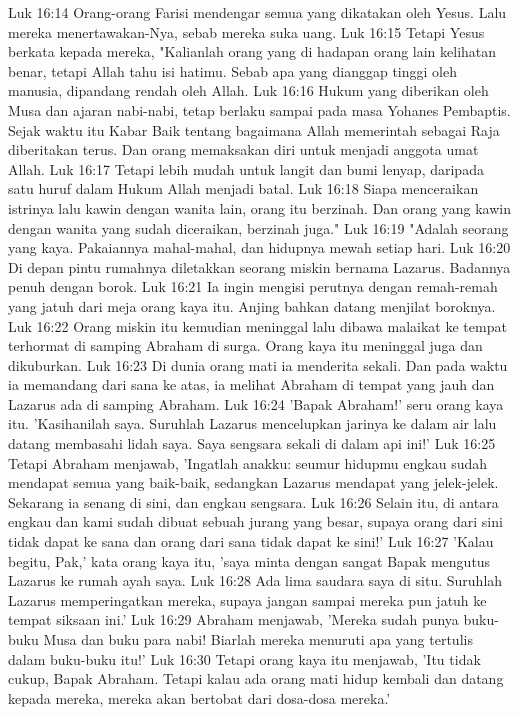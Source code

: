 Luk 16:14  Orang-orang Farisi mendengar semua yang dikatakan oleh Yesus. Lalu mereka menertawakan-Nya, sebab mereka suka uang.
Luk 16:15  Tetapi Yesus berkata kepada mereka, "Kalianlah orang yang di hadapan orang lain kelihatan benar, tetapi Allah tahu isi hatimu. Sebab apa yang dianggap tinggi oleh manusia, dipandang rendah oleh Allah.
Luk 16:16  Hukum yang diberikan oleh Musa dan ajaran nabi-nabi, tetap berlaku sampai pada masa Yohanes Pembaptis. Sejak waktu itu Kabar Baik tentang bagaimana Allah memerintah sebagai Raja diberitakan terus. Dan orang memaksakan diri untuk menjadi anggota umat Allah.
Luk 16:17  Tetapi lebih mudah untuk langit dan bumi lenyap, daripada satu huruf dalam Hukum Allah menjadi batal.
Luk 16:18  Siapa menceraikan istrinya lalu kawin dengan wanita lain, orang itu berzinah. Dan orang yang kawin dengan wanita yang sudah diceraikan, berzinah juga."
Luk 16:19  "Adalah seorang yang kaya. Pakaiannya mahal-mahal, dan hidupnya mewah setiap hari.
Luk 16:20  Di depan pintu rumahnya diletakkan seorang miskin bernama Lazarus. Badannya penuh dengan borok.
Luk 16:21  Ia ingin mengisi perutnya dengan remah-remah yang jatuh dari meja orang kaya itu. Anjing bahkan datang menjilat boroknya.
Luk 16:22  Orang miskin itu kemudian meninggal lalu dibawa malaikat ke tempat terhormat di samping Abraham di surga. Orang kaya itu meninggal juga dan dikuburkan.
Luk 16:23  Di dunia orang mati ia menderita sekali. Dan pada waktu ia memandang dari sana ke atas, ia melihat Abraham di tempat yang jauh dan Lazarus ada di samping Abraham.
Luk 16:24  'Bapak Abraham!' seru orang kaya itu. 'Kasihanilah saya. Suruhlah Lazarus mencelupkan jarinya ke dalam air lalu datang membasahi lidah saya. Saya sengsara sekali di dalam api ini!'
Luk 16:25  Tetapi Abraham menjawab, 'Ingatlah anakku: seumur hidupmu engkau sudah mendapat semua yang baik-baik, sedangkan Lazarus mendapat yang jelek-jelek. Sekarang ia senang di sini, dan engkau sengsara.
Luk 16:26  Selain itu, di antara engkau dan kami sudah dibuat sebuah jurang yang besar, supaya orang dari sini tidak dapat ke sana dan orang dari sana tidak dapat ke sini!'
Luk 16:27  'Kalau begitu, Pak,' kata orang kaya itu, 'saya minta dengan sangat Bapak mengutus Lazarus ke rumah ayah saya.
Luk 16:28  Ada lima saudara saya di situ. Suruhlah Lazarus memperingatkan mereka, supaya jangan sampai mereka pun jatuh ke tempat siksaan ini.'
Luk 16:29  Abraham menjawab, 'Mereka sudah punya buku-buku Musa dan buku para nabi! Biarlah mereka menuruti apa yang tertulis dalam buku-buku itu!'
Luk 16:30  Tetapi orang kaya itu menjawab, 'Itu tidak cukup, Bapak Abraham. Tetapi kalau ada orang mati hidup kembali dan datang kepada mereka, mereka akan bertobat dari dosa-dosa mereka.'
